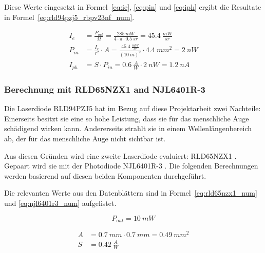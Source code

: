 Diese Werte eingesetzt in Formel~\ref{eq:ie}, \ref{eq:pin} und \ref{eq:iph} ergibt die Resultate in
Formel~\ref{eq:rld94pzj5_rbpv23nf_num}.

\begin{equation}\label{eq:rld94pzj5_rbpv23nf_num}
    \begin{split}
        I_e    &= \frac{P_{out}}{\Omega} = \frac{285~mW}{4\cdot \pi \cdot 0.5~sr} = 45.4~\frac{mW}{sr}\\
        P_{in} &= \frac{I_e}{r^2} \cdot A = \frac{45.4~\frac{mW}{sr}}{(10~m)^2} \cdot 4.4~mm^2 = 2~nW\\
        I_{ph} &= S \cdot P_{in} = 0.6~\frac{A}{W} \cdot 2~nW = 1.2~nA
    \end{split}
\end{equation}

\subsubsection{Berechnung mit RLD65NZX1 and NJL6401R-3}

Die Laserdiode RLD94PZJ5 hat im Bezug auf diese Projektarbeit zwei Nachteile: Einerseits besitzt sie eine so hohe Leistung,
dass sie für das menschliche Auge schädigend wirken kann. Andererseits strahlt sie in einem Wellenlängenbereich ab, der
für das menschliche Auge nicht sichtbar ist.

Aus diesen Gründen wird eine zweite Laserdiode evaluiert: RLD65NZX1 \cite{rohm2019rld65nzx1_datasheet}. Gepaart wird
sie mit der Photodiode NJL6401R-3 \cite{jrc2014njl6401r3_datasheet}. Die folgenden Berechnungen werden basierend auf
diesen beiden Komponenten durchgeführt.

Die relevanten Werte aus den Datenblättern sind in Formel~\ref{eq:rld65nzx1_num} und \ref{eq:njl6401r3_num} aufgelistet.

\begin{equation}\label{eq:rld65nzx1_num}
    P_{out} = 10~mW
\end{equation}

\begin{equation}\label{eq:njl6401r3_num}
    \begin{split}
        A &= 0.7~mm \cdot 0.7~mm = 0.49~mm^2\\
        S &= 0.42~\frac{A}{W}
    \end{split}
\end{equation}


